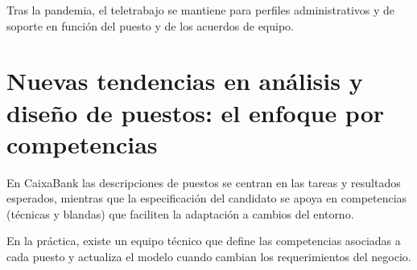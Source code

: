 Tras la pandemia, el teletrabajo se mantiene para perfiles administrativos y de soporte en función del puesto y de los acuerdos de equipo.



\section{Nuevas tendencias en análisis y diseño de puestos: el enfoque por competencias}

En CaixaBank las descripciones de puestos se centran en las tareas y resultados esperados, mientras que la especificación del candidato se apoya en competencias (técnicas y blandas) que faciliten la adaptación a cambios del entorno.

En la práctica, existe un equipo técnico que define las competencias asociadas a cada puesto y actualiza el modelo cuando cambian los requerimientos del negocio.
